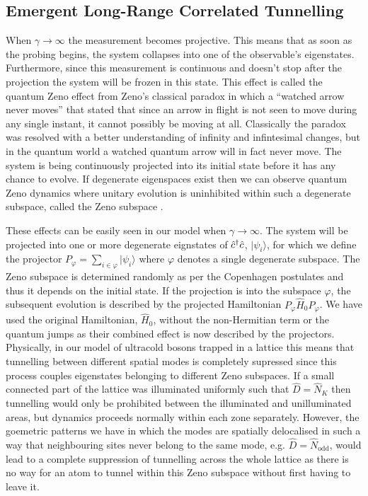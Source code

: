 \subsection{Emergent Long-Range Correlated Tunnelling}

When $\gamma \rightarrow \infty$ the measurement becomes
projective. This means that as soon as the probing begins, the system
collapses into one of the observable's eigenstates. Furthermore, since
this measurement is continuous and doesn't stop after the projection
the system will be frozen in this state. This effect is called the
quantum Zeno effect \cite{misra1977, facchi2008} from Zeno's classical
paradox in which a ``watched arrow never moves'' that stated that
since an arrow in flight is not seen to move during any single
instant, it cannot possibly be moving at all. Classically the paradox
was resolved with a better understanding of infinity and infintesimal
changes, but in the quantum world a watched quantum arrow will in fact
never move. The system is being continuously projected into its
initial state before it has any chance to evolve. If degenerate
eigenspaces exist then we can observe quantum Zeno dynamics where
unitary evolution is uninhibited within such a degenerate subspace,
called the Zeno subspace \cite{facchi2008, raimond2010, raimond2012,
  signoles2014}.

These effects can be easily seen in our model when
$\gamma \rightarrow \infty$. The system will be projected into one or
more degenerate eignstates of $\hat{c}^\dagger \hat{c}$, $| \psi_i \rangle$, for which
we define the projector
$P_\varphi = \sum_{i \in \varphi} | \psi_i \rangle$ where $\varphi$
denotes a single degenerate subspace. The Zeno subspace is determined
randomly as per the Copenhagen postulates and thus it depends on the
initial state. If the projection is into the subspace $\varphi$, the
subsequent evolution is described by the projected Hamiltonian
$P_{\varphi} \hat{H}_0 P_{\varphi}$. We have used the original
Hamiltonian, $\hat{H}_0$, without the non-Hermitian term or the
quantum jumps as their combined effect is now described by the
projectors. Physically, in our model of ultracold bosons trapped in a
lattice this means that tunnelling between different spatial modes is
completely supressed since this process couples eigenstates belonging
to different Zeno subspaces. If a small connected part of the lattice
was illuminated uniformly such that $\hat{D} = \hat{N}_K$ then
tunnelling would only be prohibited between the illuminated and
unilluminated areas, but dynamics proceeds normally within each zone
separately. However, the goemetric patterns we have in which the modes
are spatially delocalised in such a way that neighbouring sites never
belong to the same mode, e.g.  $\hat{D} = \hat{N}_\mathrm{odd}$, would
lead to a complete suppression of tunnelling across the whole lattice
as there is no way for an atom to tunnel within this Zeno subspace
without first having to leave it.

